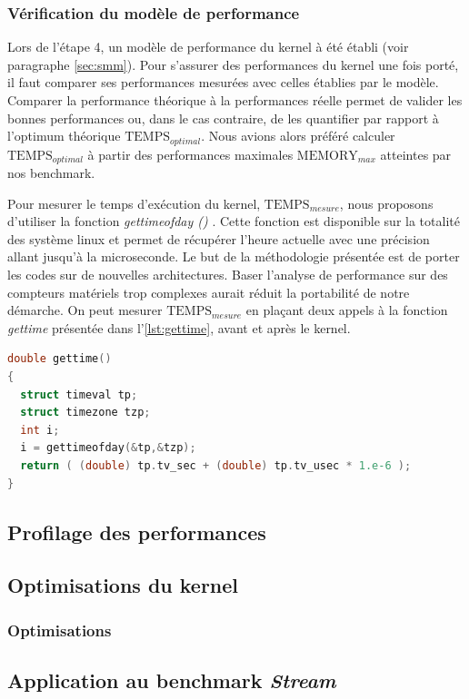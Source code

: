\subsubsection{Vérification du modèle de performance}

Lors de l'étape 4, un modèle de performance du kernel à été établi (voir paragraphe \ref{sec:smm}). Pour s'assurer des performances du kernel une fois porté, il faut comparer ses performances mesurées avec celles établies par le modèle. Comparer la performance théorique à la performances réelle permet de valider les bonnes performances ou, dans le cas contraire, de les quantifier par rapport à l'optimum théorique $\text{TEMPS}_{optimal}$. Nous avions alors préféré calculer $\text{TEMPS}_{optimal}$ à partir des performances maximales $\text{MEMORY}_{max}$ atteintes par nos benchmark.

Pour mesurer le temps d'exécution du kernel, $\text{TEMPS}_{mesure}$, nous proposons d'utiliser la fonction \textit{gettimeofday ()} \cite{Linux}. Cette fonction est disponible sur la totalité des système linux et permet de récupérer l'heure actuelle avec une précision allant jusqu'à la microseconde. Le but de la méthodologie présentée est de porter les codes sur de nouvelles architectures. Baser l'analyse de performance sur des compteurs matériels trop complexes aurait réduit la portabilité de notre démarche. On peut mesurer  $\text{TEMPS}_{mesure}$ en plaçant deux appels à la fonction \textit{gettime} présentée dans l'\autoref{lst:gettime}, avant et après le kernel.





\begin{lstlisting}[language=c,caption=Fonction utilisée pour lire la date actuelle avec une précision allant jusqu'à la microseconde,label={lst:gettime}, 
  basicstyle=\footnotesize, frame=tb,
  xleftmargin=.065\textwidth, xrightmargin=.065\textwidth]
double gettime()
{
  struct timeval tp;
  struct timezone tzp;
  int i;
  i = gettimeofday(&tp,&tzp);
  return ( (double) tp.tv_sec + (double) tp.tv_usec * 1.e-6 );
}
\end{lstlisting}


\subsection{Profilage des performances}

\subsection{Optimisations du kernel}






\subsubsection{Optimisations}


\subsection{Application au benchmark \textit{Stream}}
